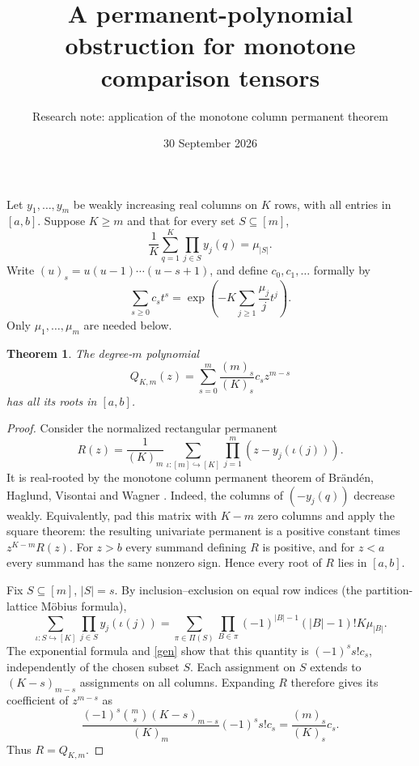 \documentclass[11pt]{article}
\title{A permanent-polynomial obstruction for monotone comparison tensors}
\author{Research note: application of the monotone column permanent theorem}
\date{30 September 2026}
\newtheorem{theorem}{Theorem}
\newcommand{\fall}[2]{(#1)_{#2}}
\begin{document}
\maketitle

Let $y_1,\ldots,y_m$ be weakly increasing real columns on $K$ rows,
with all entries in $[a,b]$. Suppose $K\ge m$ and that for every set
$S\subseteq[m]$,
\begin{equation}\label{mom}
 \frac1K\sum_{q=1}^K\prod_{j\in S}y_j(q)=\mu_{|S|}.
\end{equation}
Write $\fall{u}{s}=u(u-1)\cdots(u-s+1)$, and define $c_0,c_1,\ldots$
formally by
\begin{equation}\label{gen}
 \sum_{s\ge0}c_st^s
 =\exp\left(-K\sum_{j\ge1}\frac{\mu_j}{j}t^j\right).
\end{equation}
Only $\mu_1,\ldots,\mu_m$ are needed below.

\begin{theorem}\label{main}
The degree-$m$ polynomial
\[
 Q_{K,m}(z)=\sum_{s=0}^m
       \frac{\fall{m}{s}}{\fall{K}{s}}c_s z^{m-s}
\]
has all its roots in $[a,b]$.
\end{theorem}
\begin{proof}
Consider the normalized rectangular permanent
\[
 R(z)=\frac1{\fall K m}
 \sum_{\iota:[m]\hookrightarrow[K]}
       \prod_{j=1}^m(z-y_j(\iota(j))).
\]
It is real-rooted by the monotone column permanent theorem of
Br\"and\'en, Haglund, Visontai and Wagner \cite[Proposition 4.2]{BHVW}.
Indeed, the columns of $(-y_j(q))$ decrease weakly. Equivalently, pad
this matrix with $K-m$ zero columns and apply the square theorem:
the resulting univariate permanent is a positive constant times
$z^{K-m}R(z)$. For $z>b$ every summand defining $R$ is positive, and
for $z<a$ every summand has the same nonzero sign. Hence every root of
$R$ lies in $[a,b]$.

Fix $S\subseteq[m]$, $|S|=s$. By inclusion--exclusion on equal row
indices (the partition-lattice M\"obius formula),
\[
 \sum_{\iota:S\hookrightarrow[K]}
       \prod_{j\in S}y_j(\iota(j))
 =\sum_{\pi\in\Pi(S)}\prod_{B\in\pi}
        (-1)^{|B|-1}(|B|-1)!K\mu_{|B|}.
\]
The exponential formula and \eqref{gen} show that this quantity is
$(-1)^s s!c_s$, independently of the chosen subset $S$. Each assignment
on $S$ extends to $\fall{K-s}{m-s}$ assignments on all columns.
Expanding $R$ therefore gives its coefficient of $z^{m-s}$ as
\[
 \frac{(-1)^s\binom ms\fall{K-s}{m-s}}{\fall K m}
       (-1)^s s!c_s
 =\frac{\fall m s}{\fall K s}c_s.
\]
Thus $R=Q_{K,m}$.
\end{proof}
\end{document}
